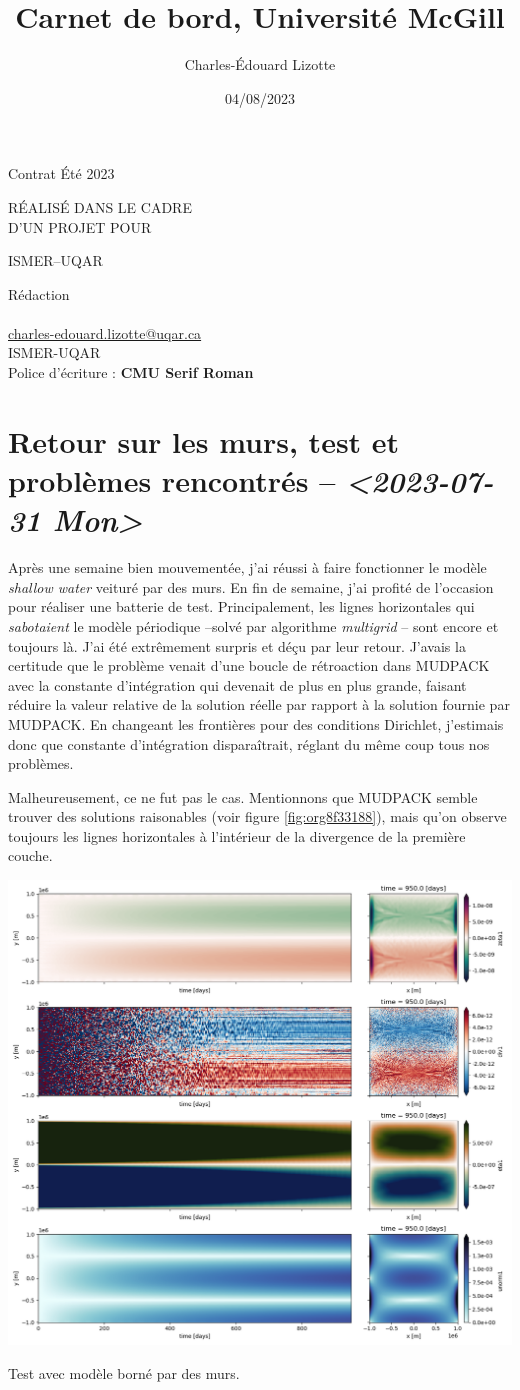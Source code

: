 \documentclass[10pt]{article}
\author{Charles-Édouard Lizotte}
\date{04/08/2023}
\title{Carnet de bord, Université McGill}
\makeatletter
\numberwithin{equation}{section}
\newcommand{\mytitlepage}{
\begin{titlepage}
\begin{center}
{\Huge \thesubtitle \par}
\vspace{2cm}
{\Huge \MakeUppercase{\thetitle} \par}
\vspace{2cm}
RÉALISÉ DANS LE CADRE\\ D'UN PROJET POUR \par
\vspace{2cm}
{\Huge ISMER--UQAR \par}
\vspace{2cm}
{\thedate}
\end{center}
\vfill
Rédaction \\
{\theauthor}\\
\url{charles-edouard.lizotte@uqar.ca}\\
ISMER-UQAR\\
Police d'écriture : \textbf{CMU Serif Roman}
\end{titlepage}
}
\newcommand{\thesubtitle}{Contrat Été 2023}
\makeatother
\begin{document}
\mytitlepage
\tableofcontents\newpage
\section{Retour sur les murs, test et problèmes rencontrés -- \textit{<2023-07-31 Mon>}}
\label{sec:org3703370}

Après une semaine bien mouvementée, j'ai réussi à faire fonctionner le modèle \emph{shallow water} veituré par des murs.
En fin de semaine, j'ai profité de l'occasion pour réaliser une batterie de test.
Principalement, les lignes horizontales qui \emph{sabotaient} le modèle périodique --solvé par algorithme \emph{multigrid} -- sont encore et toujours là.
J'ai été extrêmement surpris et déçu par leur retour.
J'avais la certitude que le problème venait d'une boucle de rétroaction dans MUDPACK avec la constante d'intégration qui devenait de plus en plus grande, faisant réduire la valeur relative de la solution réelle par rapport à la solution fournie par MUDPACK.
En changeant les frontières pour des conditions Dirichlet, j'estimais donc que constante d'intégration disparaîtrait, réglant du même coup tous nos problèmes.\bigskip

Malheureusement, ce ne fut pas le cas.
Mentionnons que MUDPACK semble trouver des solutions raisonables (voir figure \ref{fig:org8f33188}), mais qu'on observe toujours les lignes horizontales à l'intérieur de la divergence de la première couche.

\begin{center}
\includegraphics[width=.9\linewidth]{figures/tests/2023-07-31_hovmoller1_t=950days.png}
\caption{\label{fig:org8f33188}Test avec modèle borné par des murs.}
\end{center}
\newpage
\end{document}
